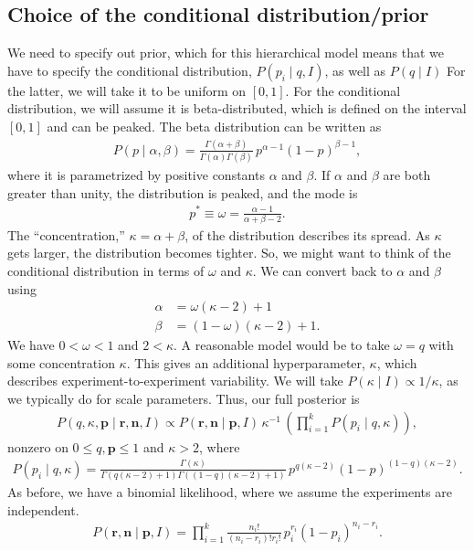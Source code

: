 \subsection{Choice of the conditional distribution/prior}
We need to specify out prior, which for this hierarchical model means
that we have to specify the conditional distribution,
$P(p_i\mid q, I)$, as well as $P(q\mid I)$ For the latter, we will
take it to be uniform on $[0, 1]$.  For the conditional distribution,
we will assume it is beta-distributed, which is defined on the
interval $[0,1]$ and can be peaked.  The beta distribution can be
written as
\begin{align}
P(p\mid \alpha, \beta) = \frac{\Gamma(\alpha+\beta)}{\Gamma(\alpha)\Gamma(\beta)}\,
p^{\alpha-1}(1-p)^{\beta-1},
\end{align}
where it is parametrized by positive constants $\alpha$ and $\beta$.
If $\alpha$ and $\beta$ are both greater than unity, the distribution
is peaked, and the mode is
\begin{align}
  p^* \equiv \omega = \frac{\alpha - 1}{\alpha + \beta - 2}.
\end{align}
The ``concentration,'' $\kappa = \alpha + \beta$, of the distribution
describes its spread.  As $\kappa$ gets larger, the distribution
becomes tighter.  So, we might want to think of the conditional
distribution in terms of $\omega$ and $\kappa$.  We can convert back
to $\alpha$ and $\beta$ using
\begin{align}
  \alpha &= \omega(\kappa - 2) + 1 \\
  \beta &= (1-\omega)(\kappa - 2) + 1.
\end{align}
We have $0 < \omega < 1$ and $2 < \kappa$.  A reasonable model would
be to take $\omega = q$ with some concentration $\kappa$.  This gives
an additional hyperparameter, $\kappa$, which describes
experiment-to-experiment variability.  We will take
$P(\kappa\mid I) \propto 1/\kappa$, as we typically do for scale
parameters.  Thus, our full posterior is
\begin{align}
P(q, \kappa,\mathbf{p}\mid \mathbf{r}, \mathbf{n},I) \propto
P(\mathbf{r},\mathbf{n}\mid \mathbf{p}, I)\,
\kappa^{-1}\,\left(\prod_{i=1}^k P(p_i\mid q,\kappa)\right),
\end{align}
nonzero on $0\le q,\mathbf{p} \le 1$ and $\kappa > 2$, where
\begin{align}
P(p_i\mid q, \kappa) =  \frac{\Gamma(\kappa)}{\Gamma(q(\kappa - 2) + 1)\Gamma((1-q)(\kappa - 2) + 1)}\,
p^{q(\kappa - 2)}(1-p)^{(1-q)(\kappa - 2)}.
\end{align}
As before, we have a binomial likelihood, where we assume the
experiments are independent.
\begin{align}
P(\mathbf{r},\mathbf{n}\mid \mathbf{p}, I) = \prod_{i=1}^k \frac{n_i!}{(n_i-r_i)!r_i!}\,
p_i^{r_i}(1-p_i)^{n_i-r_i}.
\end{align}


